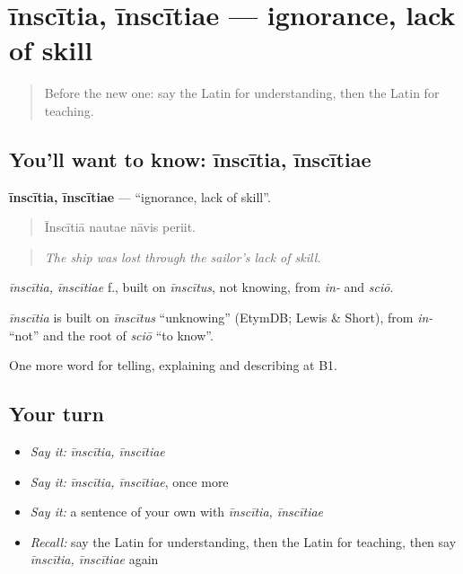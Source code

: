 \section[īnscītia, īnscītiae]{īnscītia, īnscītiae — ignorance, lack of skill}

\label{lesson:LA-C407-inscitia}



\begin{quote}
Before the new one: say the Latin for understanding, then the Latin for teaching.
\end{quote}

\subsection*{You'll want to know: īnscītia, īnscītiae}
\textbf{īnscītia, īnscītiae} — \textquotedblleft{}ignorance, lack of skill\textquotedblright{}.

\begin{quote}
Īnscītiā nautae nāvis periit.
\end{quote}

\begin{quote}
\emph{The ship was lost through the sailor's lack of skill.}
\end{quote}

\emph{īnscītia, īnscītiae} f., built on \emph{īnscītus}, not knowing, from \emph{in-} and \emph{sciō}.

\begin{cousinweb}
\emph{īnscītia} is built on \emph{īnscītus} \textquotedblleft{}unknowing\textquotedblright{} (EtymDB; Lewis \& Short), from \emph{in-} \textquotedblleft{}not\textquotedblright{} and the root of \emph{sciō} \textquotedblleft{}to know\textquotedblright{}.
\end{cousinweb}

\begin{grammarlens}[title={What you've built}]
One more word for telling, explaining and describing at B1.
\end{grammarlens}

\subsection*{Your turn}
\begin{itemize}
\raggedright
  \item \emph{Say it:} \emph{īnscītia, īnscītiae}
  \item \emph{Say it:} \emph{īnscītia, īnscītiae}, once more
  \item \emph{Say it:} a sentence of your own with \emph{īnscītia, īnscītiae}
  \item \emph{Recall:} say the Latin for understanding, then the Latin for teaching, then say \emph{īnscītia, īnscītiae} again
\end{itemize}

